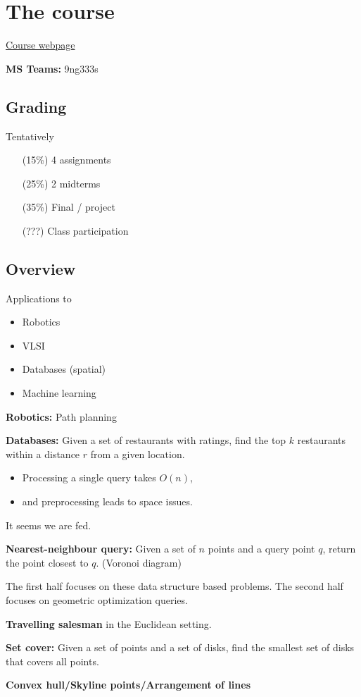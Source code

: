\chapter*{The course} \label{chp:course}

\href{https://www.csa.iisc.ac.in/~saladi/e0208/fa2024}{Course webpage}

\textbf{MS Teams:} 9ng333s

\section*{Grading}
Tentatively
\begin{itemize}
    \item[(15\%)] 4 assignments
    \item[(25\%)] 2 midterms
    \item[(35\%)] Final / project
    \item[(???)] Class participation
\end{itemize}

\section*{Overview}
Applications to
\begin{itemize}
    \item Robotics
    \item VLSI
    \item Databases (spatial)
    \item Machine learning
\end{itemize}
\begin{examples}
    \item \textbf{Robotics:} Path planning
    \item \textbf{Databases:} Given a set of restaurants with ratings,
        find the top $k$ restaurants within a distance $r$ from a given
        location.
        \begin{itemize}
            \item Processing a single query takes $O(n)$,
            \item and preprocessing leads to space issues.
        \end{itemize}
        It seems we are fed.
    \item \textbf{Nearest-neighbour query:} Given a set of $n$ points and
        a query point $q$, return the point closest to $q$.
        (Voronoi diagram)
\end{examples}
The first half focuses on these data structure based problems.
The second half focuses on geometric optimization queries.
\begin{examples}
    \item \textbf{Travelling salesman} in the Euclidean setting.
    \item \textbf{Set cover:} Given a set of points and a set of disks,
        find the smallest set of disks that covers all points.
    \item \textbf{Convex hull/Skyline points/Arrangement of lines}
\end{examples}

